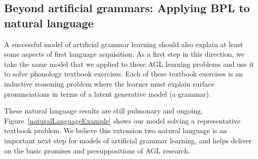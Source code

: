 \documentclass{article}
\begin{document}
\subsection{Beyond artificial grammars: Applying BPL to natural language}

A successful model of artificial grammar learning should also explain
at least some aspects of first language acquisition.  As a first step
in this direction, we take the same model that we applied to these AGL
learning problems and use it to solve phonology textbook exercises.
Each of these textbook exercises is an inductive reasoning problem
where the learner must explain surface pronunciations in terms of a
latent generative model (a grammar).

These natural language results are still pulmonary and
ongoing. Figure~\ref{naturalLanguageExample} shows our model solving a
representative textbook problem.  We believe this extension two
natural language is an important next step for models of artificial
grammar learning, and helps deliver on the basic promises and
presuppositions of AGL research.
\end{document}
